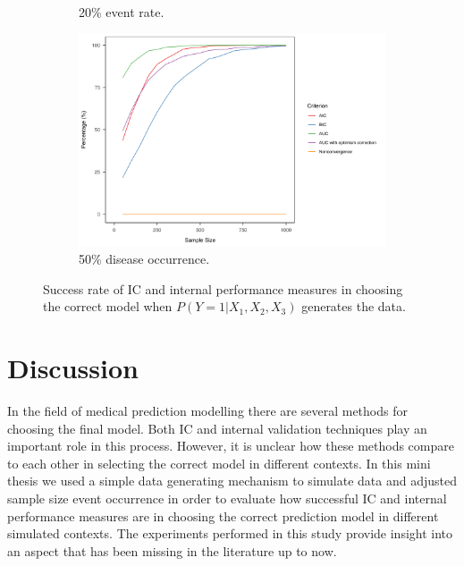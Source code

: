 \documentclass[AMA,STIX1COL]{WileyNJD-v5}
\begin{document}
\begin{figure}[h]
\begin{subfigure}[b]{0.29\textwidth}
    \caption{20\% event rate.}
    \label{fig:sub-2-figure-2}
\end{subfigure}
\hspace{-0.1cm}
\begin{subfigure}[b]{0.408\textwidth}
    \includegraphics[width=\textwidth]{"experiment_1/plot.50.png"}
    \caption{50\% disease occurrence.}
    \label{fig:sub-3-figure-2}
\end{subfigure}
        
\caption{Success rate of IC and internal performance measures in choosing the correct model when $P(Y=1|X_1,X_2,X_3)$ generates the data.}
\label{fig:figure-2}
\end{figure}

\hypertarget{sec4}{%
\section{Discussion}\label{sec4}}

In the field of medical prediction modelling there are several methods
for choosing the final model. Both IC and internal validation techniques
play an important role in this process. However, it is unclear how these
methods compare to each other in selecting the correct model in
different contexts. In this mini thesis we used a simple data generating
mechanism to simulate data and adjusted sample size event occurrence in
order to evaluate how successful IC and internal performance measures
are in choosing the correct prediction model in different simulated
contexts. The experiments performed in this study provide insight into
an aspect that has been missing in the literature up to now.
\end{document}
